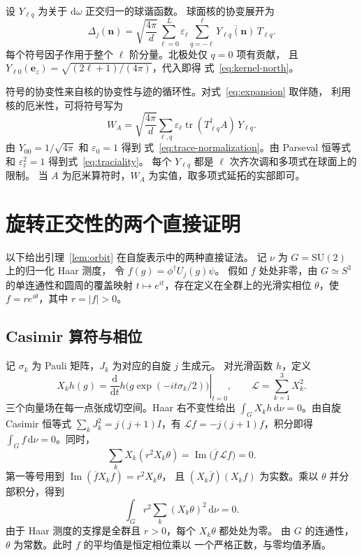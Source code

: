 \documentclass[UTF8,11pt,a4paper]{ctexart}
\theoremstyle{definition}
\DeclareMathOperator{\tr}{tr}
\newcommand{\SU}{\mathrm{SU}}
\newcommand{\dd}{\,\mathrm{d}}
\newcommand{\vn}{\mathbf n}
\begin{document}
设 \(Y_{\ell q}\) 为关于 \(\mathrm d\omega\) 正交归一的球谐函数。
球面核的协变展开为 \cite[式 (A1)--(A2)]{davis2021}
\begin{equation}
  \Delta_j(\vn)=\sqrt{\frac{4\pi}{d}}\sum_{\ell=0}^{L}
  \varepsilon_\ell\sum_{q=-\ell}^{\ell}
    \overline{Y_{\ell q}(\vn)}\,T_{\ell q}.
  \label{eq:expansion}
\end{equation}
每个符号因子作用于整个 \(\ell\) 阶分量。北极处仅 \(q=0\) 项有贡献，
且 \(Y_{\ell0}(\mathbf e_z)=\sqrt{(2\ell+1)/(4\pi)}\)，代入即得
式~\eqref{eq:kernel-north}。

符号的协变性来自核的协变性与迹的循环性。对式~\eqref{eq:expansion} 取伴随，
利用核的厄米性，可将符号写为
\[
  W_A=\sqrt{\frac{4\pi}{d}}
      \sum_{\ell,q}\varepsilon_\ell
           \tr(T_{\ell q}^\dagger A)\,Y_{\ell q}.
\]
由 \(Y_{00}=1/\sqrt{4\pi}\) 和 \(\varepsilon_0=1\) 得到
式~\eqref{eq:trace-normalization}。由 Parseval 恒等式和
\(\varepsilon_\ell^2=1\) 得到式~\eqref{eq:traciality}。
每个 \(Y_{\ell q}\) 都是 \(\ell\) 次齐次调和多项式在球面上的限制。
当 \(A\) 为厄米算符时，\(W_A\) 为实值，取多项式延拓的实部即可。

\section{旋转正交性的两个直接证明}
\label{app:orbit}

以下给出引理~\ref{lem:orbit} 在自旋表示中的两种直接证法。
记 \(\nu\) 为 \(G=\SU(2)\) 上的归一化 Haar 测度，
令 \(f(g)=\phi^\dagger U_j(g)\psi\)。
假如 \(f\) 处处非零，由 \(G\simeq S^3\) 的单连通性和圆周的覆盖映射
\(t\mapsto e^{it}\)，存在定义在全群上的光滑实相位 \(\theta\)，使
\(f=r e^{i\theta}\)，其中 \(r=|f|>0\)。

\subsection{Casimir 算符与相位}

记 \(\sigma_k\) 为 Pauli 矩阵，\(J_k\) 为对应的自旋 \(j\) 生成元。
对光滑函数 \(h\)，定义
\[
  X_kh(g)=\left.\frac{\mathrm d}{\mathrm dt}
     h\bigl(g\exp(-it\sigma_k/2)\bigr)\right|_{t=0},
  \qquad \mathcal L=\sum_{k=1}^3X_k^2.
\]
三个向量场在每一点张成切空间。Haar 右不变性给出
\(\int_G X_kh\dd\nu=0\)。由自旋 Casimir 恒等式
\(\sum_k J_k^2=j(j+1)I\)，有 \(\mathcal L f=-j(j+1)f\)，积分即得
\(\int_G f\dd\nu=0\)。同时，
\[
  \sum_k X_k(r^2X_k\theta)
  =\operatorname{Im}\bigl(\overline f\,\mathcal L f\bigr)=0 .
\]
第一等号用到 \(\operatorname{Im}(\overline f X_k f)=r^2X_k\theta\)，
且 \((X_k\overline f)(X_k f)\) 为实数。乘以 \(\theta\) 并分部积分，得到
\[
  \int_G r^2\sum_k(X_k\theta)^2\dd\nu=0 .
\]
由于 Haar 测度的支撑是全群且 \(r>0\)，每个 \(X_k\theta\) 都处处为零。
由 \(G\) 的连通性，\(\theta\) 为常数。此时 \(f\) 的平均值是恒定相位乘以
一个严格正数，与零均值矛盾。
\end{document}
